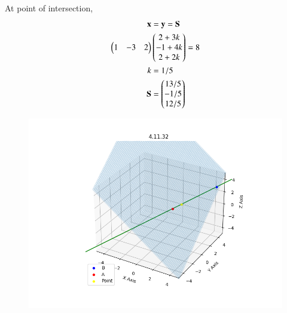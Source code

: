 \documentclass[journal,12pt,onecolumn]{IEEEtran}
\theoremstyle{remark}
\begin{document}
At point of intersection,
\begin{align}
 \mathbf{x}&=\mathbf{y}=\mathbf{S} \\
 \begin{pmatrix}1&-3&2\end{pmatrix}&\begin{pmatrix}2+3k\\-1+4k\\2+2k\end{pmatrix}=8 \\
 k &= 1/5 \\
 \mathbf{S} &= \begin{pmatrix}13/5 \\ -1/5 \\ 12/5\end{pmatrix}
\end{align}
\begin{figure}[H]
    \centering
    \includegraphics{figs/plot.png}
    \caption*{}
    \label{fig:plot}
\end{figure}
\end{document}

